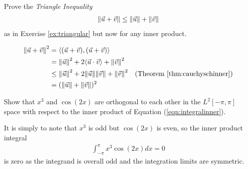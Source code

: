 \begin{Exercise}
\label{ex:triangular2}
Prove the \textit{Triangle Inequality}
\begin{align}
\norm{\vec{u} + \vec{v}} \leq \norm{\vec{u}} + \norm{\vec{v}}
\end{align}
as in Exercise \ref{ex:triangular} but now for any inner product.
\end{Exercise}
\begin{Answer}
\begin{align*}
\norm{\vec{u} + \vec{v}}^2 &= \langle (\vec{u} + \vec{v}), (\vec{u} + \vec{v}) \rangle \\
&= \norm{\vec{u}}^2 + 2\langle\vec{u}\cdot\vec{v}\rangle + \norm{\vec{v}}^2 \\
&\leq \norm{\vec{u}}^2 + 2\norm{\vec{u}}\norm{\vec{v}} + \norm{\vec{v}}^2 &\text{(Theorem \ref{thm:cauchyschinner})}\\
&= (\norm{\vec{u}} + \norm{\vec{v}})^2
\end{align*}
\end{Answer}

\begin{Exercise}
Show that $x^3$ and $\cos(2x)$ are orthogonal to each other in the $L^2[-\pi, \pi]$ space with respect to the inner product of Equation (\ref{eqn:integralinner}).
\end{Exercise}
\begin{Answer}
It is simply to note that $x^3$ is odd but $\cos(2x)$ is even, so the inner product integral
\begin{align*}
\int_{-\pi}^{\pi} x^3 \cos(2x) dx = 0
\end{align*}
is zero as the integrand is overall odd and the integration limits are symmetric.
\end{Answer}

